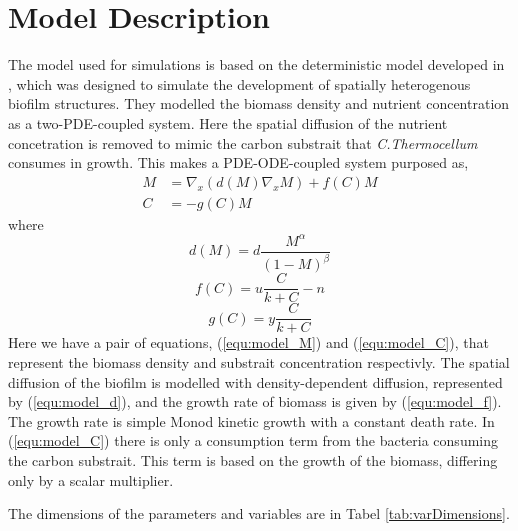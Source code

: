 \section{Model Description}
The model used for simulations is based on the deterministic model developed in \cite{eberl2001deterministic}, which was designed to simulate the development of spatially heterogenous biofilm structures.
They modelled the biomass density and nutrient concentration as a two-PDE-coupled system.
Here the spatial diffusion of the nutrient concetration is removed to mimic the carbon substrait that \textit{C.Thermocellum} consumes in growth. 
This makes a PDE-ODE-coupled system purposed as,
\begin{align} 
   M &= \nabla_x \left( d(M) \nabla_x M \right) + f(C) M \label{equ:model_M}\\
   C &= -g(C) M \label{equ:model_C}
\end{align}
where
\begin{equation} \label{equ:model_d}
  d(M) = d \frac{M^\alpha}{(1-M)^\beta}
\end{equation}
\begin{equation} \label{equ:model_f}
  f(C) = u \frac{C}{k + C} - n 
\end{equation}
\begin{equation} \label{equ:model_g}
  g(C) = y \frac{C}{k + C}
\end{equation}
Here we have a pair of equations, (\ref{equ:model_M}) and (\ref{equ:model_C}), that represent the biomass density and substrait concentration respectivly.
The spatial diffusion of the biofilm is modelled with density-dependent diffusion, represented by (\ref{equ:model_d}), and the growth rate of biomass is given by (\ref{equ:model_f}).
The growth rate is simple Monod kinetic growth with a constant death rate.
In (\ref{equ:model_C}) there is only a consumption term from the bacteria consuming the carbon substrait. This term is based on the growth of the biomass, differing only by a scalar multiplier.
 

The dimensions of the parameters and variables are in Tabel \ref{tab:varDimensions}.
  
